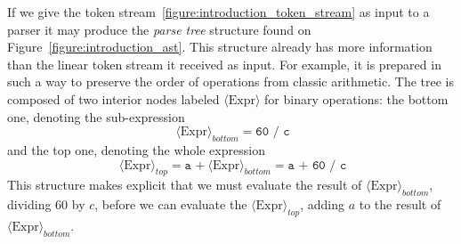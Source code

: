 \documentclass[
    oneside,
    english,
    coorientadorbanca,
    embeddedlogo,
    noabntexcite
]{ufsc-thesis-rn46-2019}
\newcommand{\bnfvar}[1]{\ \bnfvars{#1}}
\newcommand{\bnfvars}[1]{\langle\textrm{#1}\rangle}
\begin{document}
If we give the token stream~\eqref{figure:introduction_token_stream} as input to a parser it may produce the \textit{parse tree} structure found on Figure~\ref{figure:introduction_ast}.
This structure already has more information than the linear token stream it received as input.
For example, it is prepared in such a way to preserve the order of operations from classic arithmetic.
The tree is composed of two interior nodes labeled $\bnfvars{Expr}$ for binary operations: the bottom one, denoting the sub-expression
\begin{equation*}
    \bnfvar{Expr}_{bottom} = \texttt{60 / c}
\end{equation*}
and the top one, denoting the whole expression
\begin{equation*}
    \bnfvar{Expr}_{top} = \texttt{a +} \bnfvar{Expr}_{bottom} = \texttt{a + 60 / c}
\end{equation*}
This structure makes explicit that we must evaluate the result of $\bnfvars{Expr}_{bottom}$, dividing $60$ by $c$, before we can evaluate the $\bnfvars{Expr}_{top}$, adding $a$ to the result of $\bnfvars{Expr}_{bottom}$.
\end{document}
